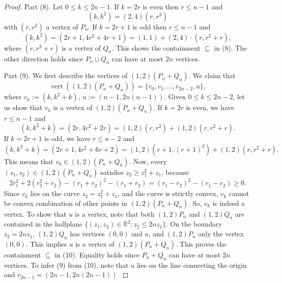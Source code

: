 \documentclass[10pt,a4paper]{article}
\newcommand{\vertset}{\operatorname{vert}}
\begin{document}
\begin{proof}
Part (8). Let $0\le k\le2n-1$. If $k=2r$ is even then $r\le n-1$ and
\[(k,k^2)=(2,4)(r,r^2)\]
with $(r,r^2)$ a vertex of $P_n$. If $k=2r+1$ is odd then $r\le n-1$ and
\[(k,k^2)=(2r+1,4r^2+4r+1)=(1,1)+(2,4)\cdot(r,r^2+r),\]
where $(r,r^2+r)$ is a vertex of $Q_n$. This shows the containment $\subseteq$ in (8). The other direction holds since $P_n\sqcup Q_n$ can have at most $2n$ vertices.

Part (9). We first describe the vertices of $(1,2)(P_n+Q_n)$. We claim that
\begin{equation}
\vertset((1,2)(P_n+Q_n))=\{v_0,v_1,\ldots,v_{2n-2},u\},\tag{10}
\end{equation}
where $v_k:=(k,k^2+k)$, $u:=(n-1,2n(n-1))$.
Given $0\le k\le2n-2$, let us show that $v_k$ is a vertex of $(1,2)(P_n+Q_n)$. If $k=2r$ is even, we have $r\le n-1$ and
\[(k,k^2+k)=(2r,4r^2+2r)=(1,2)(r,r^2)+(1,2)(r,r^2+r).\]
If $k=2r+1$ is odd, we have $r\le n-2$ and
\[(k,k^2+k)=(2r+1,4r^2+6r+2)=(1,2)(r+1,(r+1)^2)+(1,2)(r,r^2+r).\]
This means that $v_k\in(1,2)(P_n+Q_n)$. Now, every $(z_1,z_2)\in(1,2)(P_n+Q_n)$ satisfies $z_2\ge z_1^2+z_1$, because
\[2r_1^2+2(r_2^2+r_2)-(r_1+r_2)^2-(r_1+r_2)=(r_1-r_2)^2-(r_1-r_2)\ge0.\]
Since $v_k$ lies on the curve $z_2=z_1^2+z_1$, and the curve is strictly convex, $v_k$ cannot be convex combination of other points in $(1,2)(P_n+Q_n)$. So, $v_k$ is indeed a vertex. To show that $u$ is a vertex, note that both $(1,2)P_n$ and $(1,2)Q_n$ are contained in the halfplane $\{(z_1,z_2)\in\mathbb R^2:z_2\le2nz_1\}$. On the boundary $z_2=2nz_1$, $(1,2)Q_n$ has vertices $(0,0)$ and $u$, and $(1,2)P_n$ only the vertex $(0,0)$. This implies $u$ is a vertex of $(1,2)(P_n+Q_n)$. This proves the containment $\subseteq$ in (10). Equality holds since $P_n+Q_n$ can have at most $2n$ vertices.
To infer (9) from (10), note that $u$ lies on the line connecting the origin and $v_{2n-1}=(2n-1,2n(2n-1))$.
\end{proof}
\end{document}
